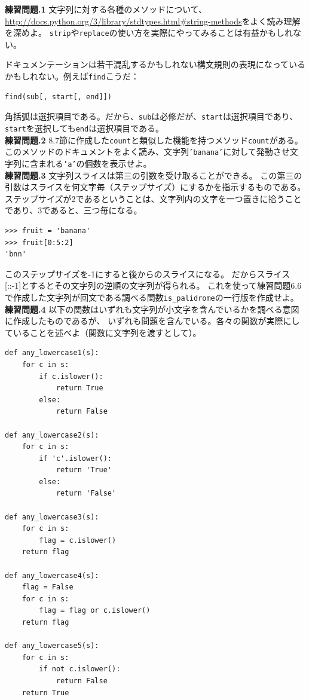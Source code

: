 \documentclass[a4j,12pt,makeidx]{jbook}
\newcommand{\tp}{\thechapter}
\begin{document}
\noindent
{\bf 練習問題\tp.1} 文字列に対する各種のメソッドについて、\\
\url{http://docs.python.org/3/library/stdtypes.html#string-methods}をよく読み理解を深めよ。
{\tt strip}や{\tt replace}の使い方を実際にやってみることは有益かもしれない。\par
ドキュメンテーションは若干混乱するかもしれない構文規則の表現になっているかもしれない。例えば{\tt find}こうだ： 
\begin{verbatim}
find(sub[, start[, end]])
\end{verbatim}
角括弧は選択項目である。だから、{\tt sub}は必修だが、{\tt start}は選択項目であり、
{\tt start}を選択しても{\tt end}は選択項目である。\\

\noindent
{\bf 練習問題\tp.2} 8.7節に作成した{\tt count}と類似した機能を持つメソッド{\tt count}がある。
このメソッドのドキュメントをよく読み、文字列{\tt 'banana'}に対して発動させ文字列に含まれる{\tt 'a'}の個数を表示せよ。\\

\noindent
{\bf 練習問題\tp.3} 文字列スライスは第三の引数を受け取ることができる。
この第三の引数はスライスを何文字毎（ステップサイズ）にするかを指示するものである。
ステップサイズが2であるということは、文字列内の文字を一つ置きに拾うことであり、3であると、三つ毎になる。
\begin{verbatim}
>>> fruit = 'banana'
>>> fruit[0:5:2]
'bnn'
\end{verbatim}
このステップサイズを-1にすると後からのスライスになる。
だからスライス[::-1]とするとその文字列の逆順の文字列が得られる。
これを使って練習問題6.6で作成した文字列が回文である調べる関数{\tt is\_palidrome}の一行版を作成せよ。\\

\noindent
{\bf 練習問題\tp.4} 以下の関数はいずれも文字列が小文字を含んでいるかを調べる意図に作成したものであるが、
いずれも問題を含んでいる。各々の関数が実際にしていることを述べよ（関数に文字列を渡すとして）。
\begin{verbatim}
def any_lowercase1(s):
    for c in s:
        if c.islower():
            return True
        else:
            return False

def any_lowercase2(s):
    for c in s:
        if 'c'.islower():
            return 'True'
        else:
            return 'False'

def any_lowercase3(s):
    for c in s:
        flag = c.islower()
    return flag

def any_lowercase4(s):
    flag = False
    for c in s:
        flag = flag or c.islower()
    return flag

def any_lowercase5(s):
    for c in s:
        if not c.islower():
            return False
    return True
\end{verbatim}
\end{document}
